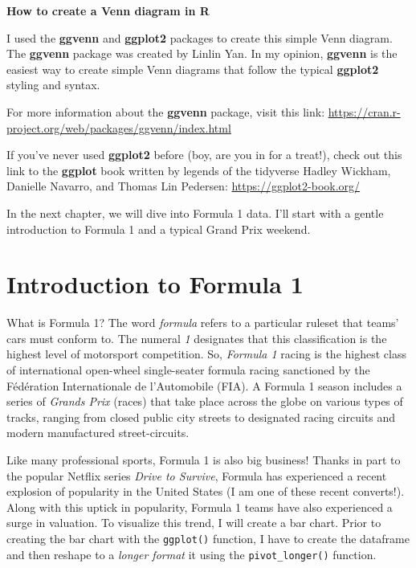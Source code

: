 \documentclass[
]{book}
\begin{document}
\begin{blackbox}

\begin{center}
\textbf{How to create a Venn diagram in R}

\end{center}

I used the \textbf{ggvenn} and \textbf{ggplot2} packages to create this simple Venn diagram. The \textbf{ggvenn} package was created by Linlin Yan. In my opinion, \textbf{ggvenn} is the easiest way to create simple Venn diagrams that follow the typical \textbf{ggplot2} styling and syntax.

For more information about the \textbf{ggvenn} package, visit this link: \url{https://cran.r-project.org/web/packages/ggvenn/index.html}

If you've never used \textbf{ggplot2} before (boy, are you in for a treat!), check out this link to the \textbf{ggplot} book written by legends of the tidyverse Hadley Wickham, Danielle Navarro, and Thomas Lin Pedersen: \url{https://ggplot2-book.org/}

\end{blackbox}

In the next chapter, we will dive into Formula 1 data. I'll start with a gentle introduction to Formula 1 and a typical Grand Prix weekend.

\hypertarget{introduction-to-formula-1}{%
\chapter{Introduction to Formula 1}\label{introduction-to-formula-1}}

What is Formula 1? The word \emph{formula} refers to a particular ruleset that teams' cars must conform to. The numeral \emph{1} designates that this classification is the highest level of motorsport competition. So, \emph{Formula 1} racing is the highest class of international open-wheel single-seater formula racing sanctioned by the Fédération Internationale de l'Automobile (FIA). A Formula 1 season includes a series of \emph{Grands Prix} (races) that take place across the globe on various types of tracks, ranging from closed public city streets to designated racing circuits and modern manufactured street-circuits.

Like many professional sports, Formula 1 is also big business! Thanks in part to the popular Netflix series \emph{Drive to Survive}, Formula has experienced a recent explosion of popularity in the United States (I am one of these recent converts!). Along with this uptick in popularity, Formula 1 teams have also experienced a surge in valuation. To visualize this trend, I will create a bar chart. Prior to creating the bar chart with the \texttt{ggplot()} function, I have to create the dataframe and then reshape to a \emph{longer format} it using the \texttt{pivot\_longer()} function.
\end{document}

